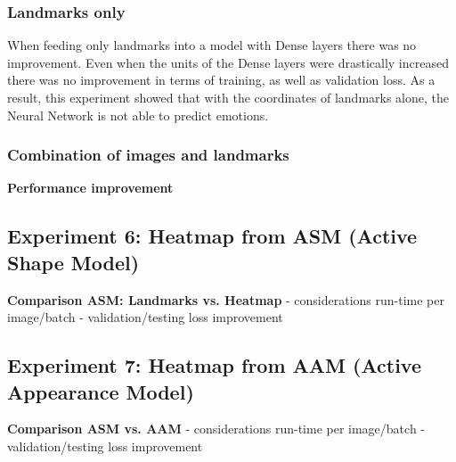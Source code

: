 \subsubsection{Landmarks only}
When feeding only landmarks into a model with Dense layers there was no improvement.
Even when the units of the Dense layers were drastically increased there was no improvement in terms of training, as well as validation loss. As a result, this experiment showed that with the coordinates of landmarks alone, the Neural Network is not able to predict emotions.

\subsubsection{Combination of images and landmarks}
\textbf{Performance improvement}


\subsection{Experiment 6: Heatmap from ASM (Active Shape Model)}

\textbf{Comparison ASM: Landmarks vs. Heatmap}
- considerations run-time per image/batch
- validation/testing loss improvement

\subsection{Experiment 7: Heatmap from AAM (Active Appearance Model)}
\textbf{Comparison ASM vs. AAM}
- considerations run-time per image/batch
- validation/testing loss improvement

